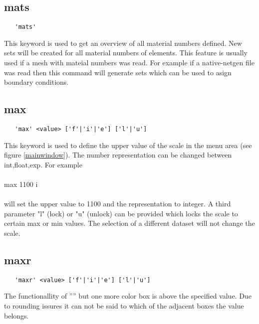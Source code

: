 \documentclass{article}
\begin{document}
\subsection{\label{mats}mats}
\begin{verbatim}
   'mats' 
\end{verbatim}
This keyword is used to get an overview of all material numbers defined. New sets will be created for all material numbers of elements. This feature is usually used if a mesh with mateial numbers was read. For example if a native-netgen file \cite{NETGEN} was read then this command will generate sets which can be used to asign boundary conditions.
 
\subsection{\label{max}max}
\begin{verbatim}
   'max' <value> ['f'|'i'|'e'] ['l'|'u']
\end{verbatim}
This keyword is used to define the upper value of the scale in the menu area (see figure \ref{mainwindow}). The number representation can be changed between int,float,exp. For example\\\\max 1100 i\\\\will set the upper value to 1100 and the representation to integer. A third parameter "l" (lock) or "u" (unlock) can be provided which locks the scale to certain max or min values. The selection of a different dataset will not change the scale.
 
\subsection{\label{maxr}maxr}
\begin{verbatim}
   'maxr' <value> ['f'|'i'|'e'] ['l'|'u']
\end{verbatim}
The functionallity of '''' but one more color box is above the specified value. Due to rounding issures it can not be said to which of the adjacent boxes the value belongs. 
\end{document}
